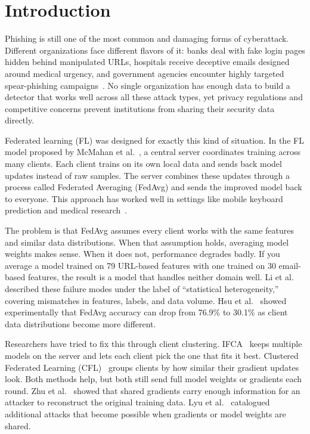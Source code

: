 \documentclass[information,article,submit,pdftex]{mdpi}
\begin{document}

\section{Introduction}\label{sec:introduction}

Phishing is still one of the most common and damaging forms of cyberattack.
Different organizations face different flavors of it: banks deal with fake login
pages hidden behind manipulated URLs, hospitals receive deceptive emails designed
around medical urgency, and government agencies encounter highly targeted
spear-phishing campaigns~\cite{salloum2022phishing}. No single organization has
enough data to build a detector that works well across all these attack types,
yet privacy regulations and competitive concerns prevent institutions from sharing
their security data directly.

Federated learning (FL) was designed for exactly this kind of situation. In the
FL model proposed by McMahan et al.~\cite{mcmahan2017communication}, a central
server coordinates training across many clients. Each client trains on its own
local data and sends back model updates instead of raw samples. The server
combines these updates through a process called Federated Averaging (FedAvg) and
sends the improved model back to everyone. This approach has worked well in
settings like mobile keyboard prediction and medical
research~\cite{bonawitz2019towards,kairouz2021advances}.

The problem is that FedAvg assumes every client works with the same features and
similar data distributions. When that assumption holds, averaging model weights
makes sense. When it does not, performance degrades badly. If you average a model
trained on 79 URL-based features with one trained on 30 email-based features, the
result is a model that handles neither domain well. Li et
al.~\cite{li2020challenges} described these failure modes under the label of
``statistical heterogeneity,'' covering mismatches in features, labels, and data
volume. Hsu et al.~\cite{hsu2019measuring} showed experimentally that FedAvg
accuracy can drop from 76.9\% to 30.1\% as client data distributions become more
different.

Researchers have tried to fix this through client clustering.
IFCA~\cite{ghosh2020ifca} keeps multiple models on the server and lets each
client pick the one that fits it best. Clustered Federated Learning
(CFL)~\cite{sattler2021cfl} groups clients by how similar their gradient updates
look. Both methods help, but both still send full model weights or gradients each
round. Zhu et al.~\cite{zhu2019deepleakage} showed that shared gradients carry
enough information for an attacker to reconstruct the original training data. Lyu
et al.~\cite{lyu2020threats} catalogued additional attacks that become possible
when gradients or model weights are shared.
\end{document}
